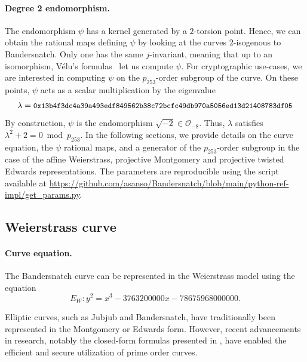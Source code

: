 \documentclass[version=preprint]{iacrcc}
\begin{document}
\paragraph{Degree 2 endomorphism.}
The endomorphism $\psi$ has a kernel generated by a $2$-torsion
point. Hence, we can obtain the rational maps defining $\psi$ by
looking at the curves $2$-isogenous to Bandersnatch. Only one has the
same $j$-invariant, meaning that up to an isomorphism, Vélu's
formulas~\cite{velu71} let us compute $\psi$.
For cryptographic use-cases, we are interested in computing $\psi$ on
the $p_{253}$-order subgroup of the curve. On these points, $\psi$
acts as a scalar multiplication by the eigenvalue
$$\lambda = \text{{\small{\tt
0x13b4f3dc4a39a493edf849562b38c72bcfc49db970a5056ed13d21408783df05}}}$$
By construction, $\psi$ is the endomorphism $\sqrt{-2}\in \mathcal
O_{-8}$. Thus, $\lambda$ satisfies
$\lambda^2+2 = 0 \bmod p_{253}$.
In the following sections, we provide details on the curve equation,
the $\psi$ rational maps, and a generator of the $p_{253}$-order
subgroup in the case of the affine Weierstrass, projective Montgomery
and projective twisted Edwards representations.
The parameters are reproducible using the script available at  \url{https://github.com/asanso/Bandersnatch/blob/main/python-ref-impl/get\_params.py}.

\subsection{Weierstrass curve}\label{sec-w-curve}
\paragraph{Curve equation.}
The Bandersnatch curve can be represented in the Weierstrass model
using the equation
$$E_W:y^2 = x^3 -3763200000x -78675968000000.$$

Elliptic curves, such as Jubjub and Bandersnatch, have traditionally been represented in the Montgomery or Edwards form. However, recent advancements in research, notably the closed-form formulas presented in \cite{EC:RenCosBat16}, have enabled the efficient and secure utilization of prime order curves. 
\end{document}
